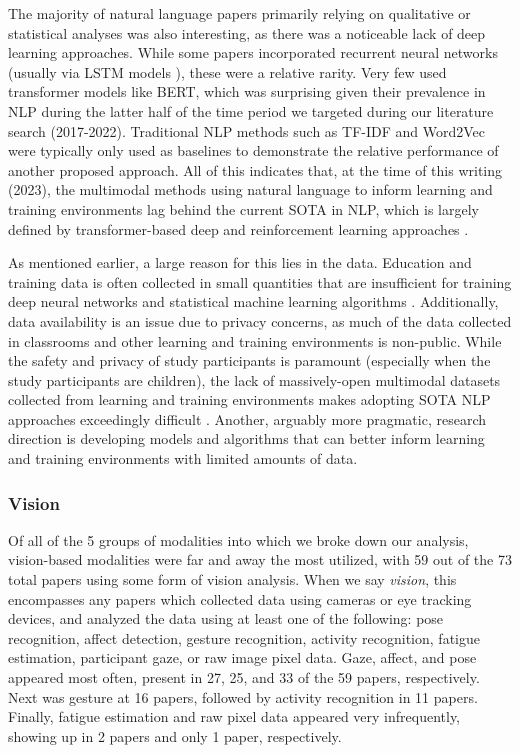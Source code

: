 \documentclass[manuscript,screen,review]{acmart}
\begin{document}
The majority of natural language papers primarily relying on qualitative or statistical analyses was also interesting, as there was a noticeable lack of deep learning approaches. While some papers incorporated recurrent neural networks (usually via LSTM models \cite{hochreiter1997long}), these were a relative rarity. Very few used transformer \cite{vaswani2017attention} models like BERT, which was surprising given their prevalence in NLP during the latter half of the time period we targeted during our literature search (2017-2022). Traditional NLP methods such as TF-IDF and Word2Vec \cite{mikolov2013efficient} were typically only used as baselines to demonstrate the relative performance of another proposed approach. All of this indicates that, at the time of this writing (2023), the multimodal methods using natural language to inform learning and training environments lag behind the current SOTA in NLP, which is largely defined by transformer-based deep and reinforcement learning approaches \cite{touvron2023llama}.

As mentioned earlier, a large reason for this lies in the data. Education and training data is often collected in small quantities \cite{snyder2023using,snyder2023analyzing} that are insufficient for training deep neural networks and statistical machine learning algorithms \cite{957160695}. Additionally, data availability is an issue due to privacy concerns, as much of the data collected in classrooms and other learning and training environments is non-public. While the safety and privacy of study participants is paramount (especially when the study participants are children), the lack of massively-open multimodal datasets collected from learning and training environments makes adopting SOTA NLP approaches exceedingly difficult \cite{3796643912}. Another, arguably more pragmatic, research direction is developing models and algorithms that can better inform learning and training environments with limited amounts of data.

\subsubsection{Vision}\label{subsubsec:vision}
Of all of the 5 groups of modalities into which we broke down our analysis, vision-based modalities were far and away the most utilized, with 59 out of the 73 total papers using some form of vision analysis. When we say \textit{vision}, this encompasses any papers which collected data using cameras or eye tracking devices, and analyzed the data using at least one of the following: pose recognition, affect detection, gesture recognition, activity recognition, fatigue estimation, participant gaze, or raw image pixel data. Gaze, affect, and pose appeared most often, present in 27, 25, and 33 of the 59 papers, respectively. Next was gesture at 16 papers, followed by activity recognition in 11 papers. Finally, fatigue estimation and raw pixel data appeared very infrequently, showing up in 2 papers and only 1 paper, respectively.
\end{document}
